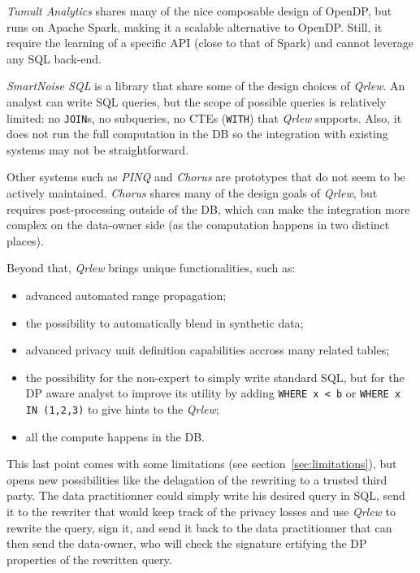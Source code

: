 \documentclass[letterpaper]{article} %
\newcommand{\qrlew}{\emph{Qrlew}}
\begin{document}
\emph{Tumult Analytics} \cite{berghel2022tumult} shares many of the nice composable design of OpenDP, but runs on Apache Spark, making it a scalable alternative to OpenDP. Still, it require the learning of a specific API (close to that of Spark) and cannot leverage any SQL back-end.

\emph{SmartNoise SQL} is a library that share some of the design choices of \qrlew{}. An analyst can write SQL queries, but the scope of possible queries is relatively limited: no \texttt{JOIN}s, no subqueries, no CTEs (\texttt{WITH}) that \qrlew{} supports. Also, it does not run the full computation in the DB so the integration with existing systems may not be straightforward.

Other systems such as \emph{PINQ} \cite{mcsherry2009privacy} and \emph{Chorus} \cite{johnson2020chorus} are prototypes that do not seem to be actively maintained. \emph{Chorus} shares many of the design goals of \qrlew{}, but requires post-processing outside of the DB, which can make the integration more complex on the data-owner side (as the computation happens in two distinct places).

Beyond that, \qrlew{} brings unique functionalities, such as:
\begin{itemize}
    \item advanced automated range propagation;
    \item the possibility to automatically blend in synthetic data;
    \item advanced privacy unit definition capabilities accross many related tables;
    \item the possibility for the non-expert to simply write standard SQL, but for the DP aware analyst to improve its utility by adding \texttt{WHERE x < b} or \texttt{WHERE x IN (1,2,3)} to give hints to the \qrlew{};
    \item all the compute happens in the DB.
\end{itemize}

This last point comes with some limitations (see section~\ref{sec:limitations}), but opens new possibilities like the delagation of the rewriting to a trusted third party. The data practitionner could simply write his desired query in SQL, send it to the rewriter that would keep track of the privacy losses and use \qrlew{} to rewrite the query, sign it, and send it back to the data practitionner that can then send the data-owner, who will check the signature ertifying the DP properties of the rewritten query.
\end{document}
